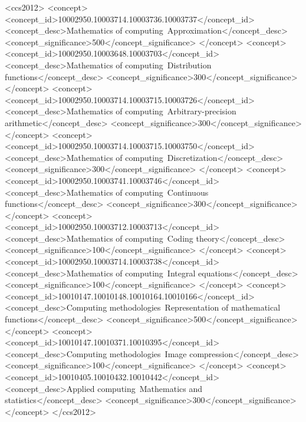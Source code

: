 \documentclass[sigplan,screen]{acmart}
\theoremstyle{acmplain}
\theoremstyle{acmdefinition}
\begin{document}
\begin{CCSXML}
<ccs2012>
<concept>
<concept_id>10002950.10003714.10003736.10003737</concept_id>
<concept_desc>Mathematics of computing~Approximation</concept_desc>
<concept_significance>500</concept_significance>
</concept>
<concept>
<concept_id>10002950.10003648.10003703</concept_id>
<concept_desc>Mathematics of computing~Distribution functions</concept_desc>
<concept_significance>300</concept_significance>
</concept>
<concept>
<concept_id>10002950.10003714.10003715.10003726</concept_id>
<concept_desc>Mathematics of computing~Arbitrary-precision arithmetic</concept_desc>
<concept_significance>300</concept_significance>
</concept>
<concept>
<concept_id>10002950.10003714.10003715.10003750</concept_id>
<concept_desc>Mathematics of computing~Discretization</concept_desc>
<concept_significance>300</concept_significance>
</concept>
<concept>
<concept_id>10002950.10003741.10003746</concept_id>
<concept_desc>Mathematics of computing~Continuous functions</concept_desc>
<concept_significance>300</concept_significance>
</concept>
<concept>
<concept_id>10002950.10003712.10003713</concept_id>
<concept_desc>Mathematics of computing~Coding theory</concept_desc>
<concept_significance>100</concept_significance>
</concept>
<concept>
<concept_id>10002950.10003714.10003738</concept_id>
<concept_desc>Mathematics of computing~Integral equations</concept_desc>
<concept_significance>100</concept_significance>
</concept>
<concept>
<concept_id>10010147.10010148.10010164.10010166</concept_id>
<concept_desc>Computing methodologies~Representation of mathematical functions</concept_desc>
<concept_significance>500</concept_significance>
</concept>
<concept>
<concept_id>10010147.10010371.10010395</concept_id>
<concept_desc>Computing methodologies~Image compression</concept_desc>
<concept_significance>100</concept_significance>
</concept>
<concept>
<concept_id>10010405.10010432.10010442</concept_id>
<concept_desc>Applied computing~Mathematics and statistics</concept_desc>
<concept_significance>300</concept_significance>
</concept>
</ccs2012>
\end{CCSXML}

\end{document}
